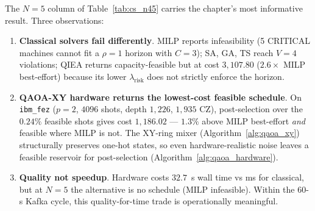 \begin{table}[!htbp]
\centering
\caption{Head-to-head on streaming complex-constraint instances at $N=4$ and $N=5$.}
\label{tab:cs_n45}
\small
\renewcommand{\arraystretch}{1.05}
\setlength{\tabcolsep}{4pt}
\end{table}
\FloatBarrier

The $N=5$ column of Table~\ref{tab:cs_n45} carries the chapter's most informative result. Three observations:
\begin{enumerate}
\item \textbf{Classical solvers fail differently}. MILP reports infeasibility (5 CRITICAL machines cannot fit a $\rho=1$ horizon with $C=3$); SA, GA, TS reach $V=4$ violations; QIEA returns capacity-feasible but at cost $3{,}107.80$ ($2.6\times$ MILP best-effort) because its lower $\lambda_{\text{risk}}$ does not strictly enforce the horizon.
\item \textbf{QAOA-XY hardware returns the lowest-cost feasible schedule}. On \texttt{ibm\_fez} ($p=2$, $4096$ shots, depth $1{,}226$, $1{,}935$ CZ), post-selection over the $0.24\%$ feasible shots gives cost $1{,}186.02$ — $1.3\%$ above MILP best-effort \emph{and} feasible where MILP is not. The XY-ring mixer (Algorithm~\ref{alg:qaoa_xy}) structurally preserves one-hot states, so even hardware-realistic noise leaves a feasible reservoir for post-selection (Algorithm~\ref{alg:qaoa_hardware}).
\item \textbf{Quality not speedup}. Hardware costs $32.7$~s wall time vs ms for classical, but at $N=5$ the alternative is no schedule (MILP infeasible). Within the 60-s Kafka cycle, this quality-for-time trade is operationally meaningful.
\end{enumerate}


